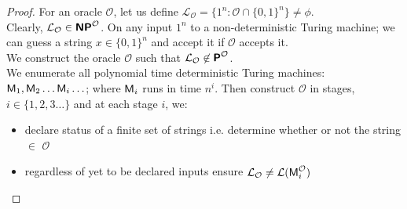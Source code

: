 \documentclass[usletter]{article}
\newcommand {\langset}[1]      {\ensuremath{\mathcal{#1}}}
\newcommand {\machine}[1]      {\ensuremath{\textnormal{\textsf{#1}}}}
\newcommand {\family}[1]       {\ensuremath{\textnormal{\textsf{\textbf{#1}}}}}
\begin{document}
\begin{proof}
For an oracle \langset{O}, let us define
$\langset{L}_\langset{O} = \{ 1^n : \langset{O} \cap \{0,1\}^n \} \neq \phi$. \\
Clearly, $\langset{L}_\langset{O} \in \family{NP}^\langset{O}$.
On any input $1^n$ to a non-deterministic Turing machine; we can guess a string
$x \in \{0,1\}^n$ and accept it if \langset{O} accepts it. \\

\noindent
We construct the oracle \langset{O} such that
$\langset{L}_\langset{O} \not\in \family{P}^\langset{O}$. \\
We enumerate all polynomial time deterministic Turing machines:
$\machine{M}_1, \machine{M}_2 \ldots \machine{M}_i \ldots$;
where $\machine{M}_i$ runs in time $n^i$. Then construct \langset{O} in stages,
$i \in \{1, 2, 3 \ldots\}$ and at each stage $i$, we:
\begin{itemize}
  \item declare status of a finite set of strings
    i.e. determine whether or not the string $\in$ \langset{O}
  \item regardless of yet to be declared inputs ensure
    $\langset{L}_\langset{O} \neq \langset{L}(\machine{M}_i^\langset{O})$ 
\end{itemize}


\end{proof}
\end{document}

